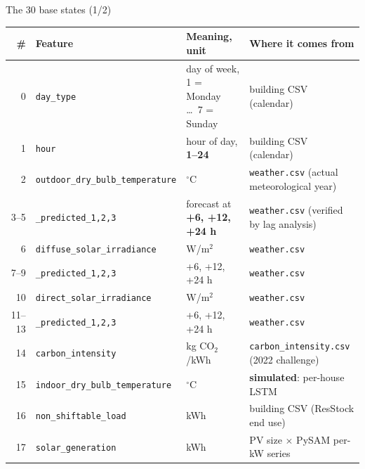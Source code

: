 \documentclass[aspectratio=169,10pt]{beamer}
\begin{document}
\begin{frame}{The 30 base states (1/2)}
\scriptsize
\begin{tabularx}{\textwidth}{@{}rl>{\raggedright\arraybackslash}X>{\raggedright\arraybackslash}p{4.2cm}@{}}
\toprule
\# & Feature & Meaning, unit & Where it comes from \\
\midrule
0 & \texttt{day\_type} & day of week, 1 = Monday \dots\ 7 = Sunday & building CSV (calendar) \\
1 & \texttt{hour} & hour of day, \textbf{1--24} & building CSV (calendar) \\
2 & \texttt{outdoor\_dry\_bulb\_temperature} & $^\circ$C & \texttt{weather.csv} (actual meteorological year) \\
3--5 & \quad \texttt{\_predicted\_1,2,3} & forecast at \textbf{+6, +12, +24 h} & \texttt{weather.csv} (verified by lag analysis) \\
6 & \texttt{diffuse\_solar\_irradiance} & W/m$^2$ & \texttt{weather.csv} \\
7--9 & \quad \texttt{\_predicted\_1,2,3} & +6, +12, +24 h & \texttt{weather.csv} \\
10 & \texttt{direct\_solar\_irradiance} & W/m$^2$ & \texttt{weather.csv} \\
11--13 & \quad \texttt{\_predicted\_1,2,3} & +6, +12, +24 h & \texttt{weather.csv} \\
14 & \texttt{carbon\_intensity} & kg CO$_2$/kWh & \texttt{carbon\_intensity.csv} (2022 challenge) \\
15 & \texttt{indoor\_dry\_bulb\_temperature} & $^\circ$C & \textbf{simulated}: per-house LSTM \\
16 & \texttt{non\_shiftable\_load} & kWh & building CSV (ResStock end use) \\
17 & \texttt{solar\_generation} & kWh & PV size $\times$ PySAM per-kW series \\
\bottomrule
\end{tabularx}
\end{frame}
\end{document}
